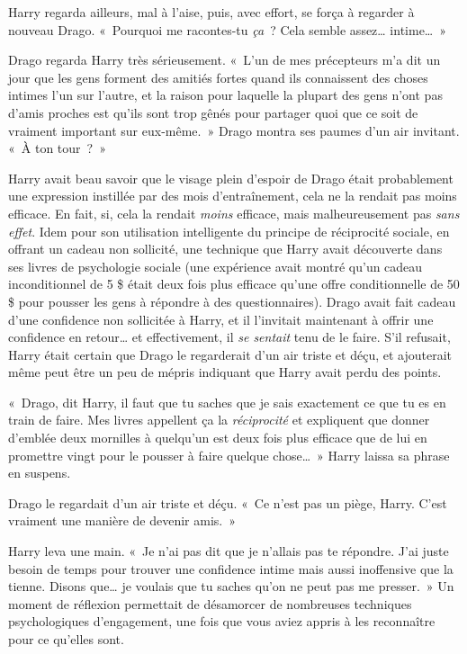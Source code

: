 Harry regarda ailleurs, mal à l'aise, puis, avec effort, se força à regarder à nouveau Drago.
«~Pourquoi me racontes-tu \emph{ça}~? Cela semble assez… intime…~»

Drago regarda Harry très sérieusement.
«~L'un de mes précepteurs m'a dit un jour que les gens forment des amitiés fortes quand ils connaissent des choses intimes l'un sur l'autre, et la raison pour laquelle la plupart des gens n'ont pas d'amis proches est qu'ils sont trop gênés pour partager quoi que ce soit de vraiment important sur eux-même.~»
Drago montra ses paumes d'un air invitant. «~À ton tour~?~»

Harry avait beau savoir que le visage plein d'espoir de Drago était probablement une expression instillée par des mois d'entraînement, cela ne la rendait pas moins efficace.
En fait, si, cela la rendait \emph{moins} efficace, mais malheureusement pas \emph{sans effet}.
Idem pour son utilisation intelligente du principe de réciprocité sociale, en offrant un cadeau non sollicité, une technique que Harry avait découverte dans ses livres de psychologie sociale (une expérience avait montré qu'un cadeau inconditionnel de 5 \$ était deux fois plus efficace qu'une offre conditionnelle de 50 \$ pour pousser les gens à répondre à des questionnaires).
Drago avait fait cadeau d'une confidence non sollicitée à Harry, et il l'invitait maintenant à offrir une confidence en retour… et effectivement, il \emph{se sentait} tenu de le faire.
S'il refusait, Harry était certain que Drago le regarderait d'un air triste et déçu, et ajouterait même peut être un peu de mépris indiquant que Harry avait perdu des points.

«~Drago, dit Harry, il faut que tu saches que je sais exactement ce que tu es en train de faire. Mes livres appellent ça la \emph{réciprocité} et expliquent que donner d'emblée deux mornilles à quelqu'un est deux fois plus efficace que de lui en promettre vingt pour le pousser à faire quelque chose…~»
Harry laissa sa phrase en suspens.

Drago le regardait d'un air triste et déçu. «~Ce n'est pas un piège, Harry. C'est vraiment une manière de devenir amis.~»

Harry leva une main. «~Je n'ai pas dit que je n'allais pas te répondre.
J'ai juste besoin de temps pour trouver une confidence intime mais aussi inoffensive que la tienne.
Disons que… je voulais que tu saches qu'on ne peut pas me presser.~»
Un moment de réflexion permettait de désamorcer de nombreuses techniques psychologiques d'engagement, une fois que vous aviez appris à les reconnaître pour ce qu'elles sont.

